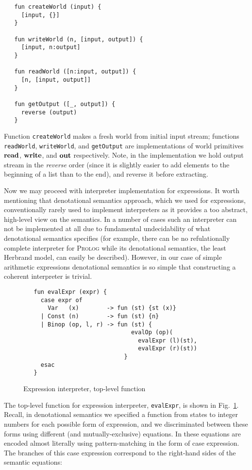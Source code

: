 \begin{lstlisting}
   fun createWorld (input) {
     [input, {}]
   }

   fun writeWorld (n, [input, output]) {
     [input, n:output]
   }

   fun readWorld ([n:input, output]) {
     [n, [input, output]]
   }

   fun getOutput ([_, output]) {
     reverse (output)
   }
\end{lstlisting}

Function \lstinline|createWorld| makes a fresh world from initial input stream; functions \lstinline|readWorld|, \lstinline|writeWorld|, and \lstinline|getOutput|
are implementations of world primitives $\mathbf{read}$, $\mathbf{write}$, and $\mathbf{out}$ respectively. Note, in the implementation we hold output stream
in the \emph{reverse} order (since it is slightly easier to add elements to the beginning of a list than to the end), and reverse it before extracting.

Now we may proceed with interpreter implementation for expressions. It worth mentioning that denotational semantics approach, which we used for expressions, conventionally
rarely used to implement interpreters as it provides a too abstract, high-level view on the semantics. In a number of cases such an interpreter can not be
implemented at all due to fundamental undecidability of what denotational semantics specifies (for example, there can be no refulationally complete interpreter
for \textsc{Prolog} while its denotational semantics, the least Herbrand model, can easily be described). However, in our case of simple arithmetic expressions
denotational semantics is so simple that constructing a coherent interpreter is trivial.

\begin{figure}[t]
  \begin{lstlisting}
   fun evalExpr (expr) {
     case expr of
       Var   (x)        -> fun (st) {st (x)}
     | Const (n)        -> fun (st) {n}
     | Binop (op, l, r) -> fun (st) {
                               evalOp (op)(
                                 evalExpr (l)(st),
                                 evalExpr (r)(st))
                             }
     esac
   }
  \end{lstlisting}
  \caption{Expression interpreter, top-level function}
  \label{exprint-toplevel}
\end{figure}

The top-level function for expression interpreter, \lstinline{evalExpr}, is shown in Fig.~\ref{exprint-toplevel}. Recall, in denotational semantics we specified a function
from states to integer numbers for each possible form of expression, and we discriminated between these forms using different (and mutually-exclusive) equations.
In \lama these equations are encoded almost literally using pattern-matching in the form of case expression. The branches of this case expression
correspond to the right-hand sides of the semantic equations:

